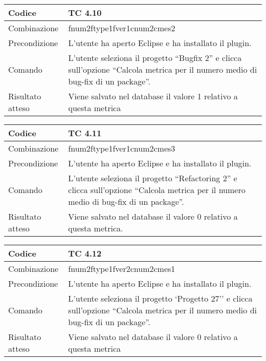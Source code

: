 \begin{table}[ht]
\begin{tabular}{|p{3cm}|p{9cm}|}
\hline
\cellcolor{lightgray}Codice				& TC 4.10								\\
\hline
\cellcolor{lightgray}Combinazione		& fnum2ftype1fver1cnum2cmes2 									\\
\hline
\cellcolor{lightgray}Precondizione		& L'utente ha aperto Eclipse e ha installato il plugin.									\\
\hline
\cellcolor{lightgray}Comando			& L'utente seleziona il progetto ``Bugfix 2''  e clicca sull'opzione ``Calcola metrica per il numero medio di bug-fix di un package''.	\\
\hline
\cellcolor{lightgray}Risultato atteso	& Viene salvato nel database il valore 1 relativo a questa metrica	\\
\hline
\end{tabular}
\end{table}
\clearpage

\begin{table}[ht]
\begin{tabular}{|p{3cm}|p{9cm}|}
\hline
\cellcolor{lightgray}Codice				& TC 4.11								\\
\hline
\cellcolor{lightgray}Combinazione		& fnum2ftype1fver1cnum2cmes3									\\
\hline
\cellcolor{lightgray}Precondizione		& L'utente ha aperto Eclipse e ha installato il plugin.		\\
\hline
\cellcolor{lightgray}Comando			& L'utente seleziona il progetto ``Refactoring 2''  e clicca sull'opzione ``Calcola metrica per il numero medio di bug-fix di un package''.	\\
\hline
\cellcolor{lightgray}Risultato atteso	& Viene salvato nel database il valore 0 relativo a questa metrica.\\
\hline
\end{tabular}
\end{table}

\begin{table}[ht]
\begin{tabular}{|p{3cm}|p{9cm}|}
\hline
\cellcolor{lightgray}Codice				& TC 4.12								\\
\hline
\cellcolor{lightgray}Combinazione		& fnum2ftype1fver2cnum2cmes1 									\\
\hline
\cellcolor{lightgray}Precondizione		& L'utente ha aperto Eclipse e ha installato il plugin.				\\
\hline
\cellcolor{lightgray}Comando			& L'utente seleziona il progetto `Progetto 27''  e clicca sull'opzione ``Calcola metrica per il numero medio di bug-fix di un package''.	\\
\hline
\cellcolor{lightgray}Risultato atteso	& Viene salvato nel database il valore 0 relativo a questa metrica	\\
\hline
\end{tabular}
\end{table}

